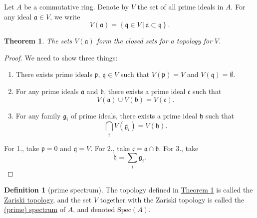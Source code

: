 \documentclass[a4paper]{report}
\newcommand{\defn}[1]{\ul{#1}}
\newcommand{\Spec}{\mathrm{Spec}}
\theoremstyle{definition}
\newtheorem{definition}{Definition}[section]
\theoremstyle{plain}
\newtheorem{theorem}{Theorem}[section]
\theoremstyle{remark}
\begin{document}
Let $A$ be a commutative ring. Denote by $V$ the set of all prime ideals in $A$. For any ideal $\mathfrak{a} \in V$, we write
\begin{equation*}
  V(\mathfrak{a}) = \left\{ \mathfrak{q} \in V\,\big|\, \mathfrak{a} \subset \mathfrak{q} \right\}.
\end{equation*}

\begin{theorem}
  \label{thm:zartopisatopology}
  The sets $V(\mathfrak{a})$ form the closed sets for a topology for $V$.
\end{theorem}
\begin{proof}
  We need to show three things:
  \begin{enumerate}
    \item There exists prime ideals $\mathfrak{p}$, $\mathfrak{q} \in V$ such that $V(\mathfrak{p}) = V$ and $V(\mathfrak{q}) = \emptyset$.

    \item For any prime ideals $\mathfrak{a}$ and $\mathfrak{b}$, there exists a prime ideal $\mathfrak{c}$ such that 
      \begin{equation*}
        V(\mathfrak{a}) \cup V(\mathfrak{b}) = V(\mathfrak{c}).
      \end{equation*}

    \item For any family $\mathfrak{g}_{i}$ of prime ideals, there exists a prime ideal $\mathfrak{h}$ such that 
      \begin{equation*}
        \bigcap_{i} V(\mathfrak{g}_{i}) = V(\mathfrak{h}).
      \end{equation*}
  \end{enumerate}

  For 1., take $\mathfrak{p} = 0$ and $\mathfrak{q} = V$. For 2., take $\mathfrak{c} = \mathfrak{a} \cap \mathfrak{b}$. For 3., take 
  \begin{equation*}
    \mathfrak{h} = \sum_{i} \mathfrak{g}_{i}.
  \end{equation*}
\end{proof}

\begin{definition}[prime spectrum]
  \label{def:primespectrumofaring}
  The topology defined in \hyperref[thm:zartopisatopology]{Theorem \ref*{thm:zartopisatopology}} is called the \defn{Zariski topology}, and the set $V$ together with the Zariski topology is called the \defn{(prime) spectrum} of $A$, and denoted $\Spec(A)$.
\end{definition}
\end{document}
